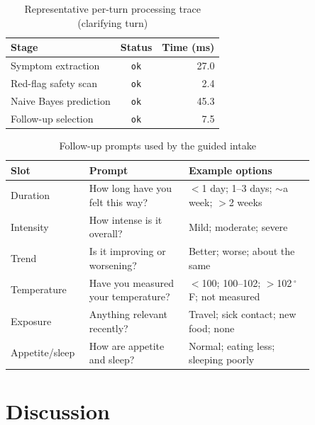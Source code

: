 \documentclass[conference]{IEEEtran}
\newcommand{\degF}{$^{\circ}$F}
\newcommand{\code}[1]{\texttt{\small #1}}
\begin{document}
\begin{table}[t]
\caption{Representative per-turn processing trace (clarifying turn)}
\label{tab:trace}
\centering
\footnotesize
\begin{tabular}{@{}l c r@{}}
\toprule
\textbf{Stage} & \textbf{Status} & \textbf{Time (ms)}\\
\midrule
Symptom extraction     & \code{ok} & 27.0\\
Red-flag safety scan   & \code{ok} & 2.4\\
Naive Bayes prediction & \code{ok} & 45.3\\
Follow-up selection    & \code{ok} & 7.5\\
\bottomrule
\end{tabular}
\end{table}

\begin{table}[t]
\caption{Follow-up prompts used by the guided intake}
\label{tab:prompts}
\centering
\footnotesize
\begin{tabular}{@{}p{0.17\linewidth} p{0.30\linewidth} p{0.38\linewidth}@{}}
\toprule
\textbf{Slot} & \textbf{Prompt} & \textbf{Example options}\\
\midrule
Duration & How long have you felt this way? &
$<$1 day; 1--3 days; $\sim$a week; $>$2 weeks\\[1pt]
Intensity & How intense is it overall? &
Mild; moderate; severe\\[1pt]
Trend & Is it improving or worsening? &
Better; worse; about the same\\[1pt]
Temperature & Have you measured your temperature? &
$<$100; 100--102; $>$102\,\degF; not measured\\[1pt]
Exposure & Anything relevant recently? &
Travel; sick contact; new food; none\\[1pt]
Appetite/sleep & How are appetite and sleep? &
Normal; eating less; sleeping poorly\\
\bottomrule
\end{tabular}
\end{table}

\section{Discussion}
\end{document}
